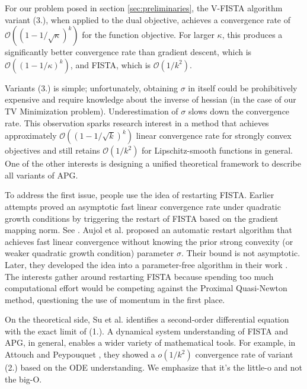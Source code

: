 \documentclass[]{article}
\theoremstyle{definition}
\numberwithin{equation}{subsection}
\begin{document}
        For our problem posed in section \ref*{sec:preliminaries}, the V-FISTA algorithm variant (3.), when applied to the dual objective, achieves a convergence rate of $\mathcal O((1 - 1/\sqrt{\kappa})^k)$ for the function objective. 
        For larger $\kappa$, this produces a significantly better convergence rate than gradient descent, which is $\mathcal O((1 - 1/\kappa)^k)$, and FISTA, which is $\mathcal O(1/k^2)$. 
        \par
        Variants (3.) is simple; unfortunately, obtaining $\sigma$ in itself could be prohibitively expensive and require knowledge about the inverse of hessian (in the case of our TV Minimization problem). 
        Underestimation of $\sigma$ slows down the convergence rate. 
        This observation sparks research interest in a method that achieves approximately $\mathcal O((1 - 1/\sqrt{k})^k)$ linear convergence rate for strongly convex objectives and still retains $\mathcal O(1/k^2)$ for Lipschitz-smooth functions in general. 
        One of the other interests is designing a unified theoretical framework to describe all variants of APG. 
        \par
        To address the first issue, people use the idea of restarting FISTA.
        Earlier attempts proved an asymptotic fast linear convergence rate under quadratic growth conditions by triggering the restart of FISTA based on the gradient mapping norm. 
        See \cite{alamo_gradient_2019}\cite{fercoq_adaptive_2019}. 
        Aujol et al.\cite{aujol_fista_2022} proposed an automatic restart algorithm that achieves fast linear convergence without knowing the prior strong convexity (or weaker quadratic growth condition) parameter $\sigma$. 
        Their bound is not asymptotic. 
        Later, they developed the idea into a parameter-free algorithm in their work \cite{aujol_parameter-free_2023}. 
        The interests gather around restarting FISTA because spending too much computational effort would be competing against the Proximal Quasi-Newton method, questioning the use of momentum in the first place. 
        \par
        On the theoretical side, Su et al. \cite{su_differential_2015} identifies a second-order differential equation with the exact limit of (1.). 
        A dynamical system understanding of FISTA and APG, in general, enables a wider variety of mathematical tools. 
        For example, in Attouch and Peypouquet \cite{attouch_rate_2016}, they showed a $o(1/k^2)$ convergence rate of variant (2.) based on the ODE understanding. 
        We emphasize that it's the little-o and not the big-O. 
\end{document}
